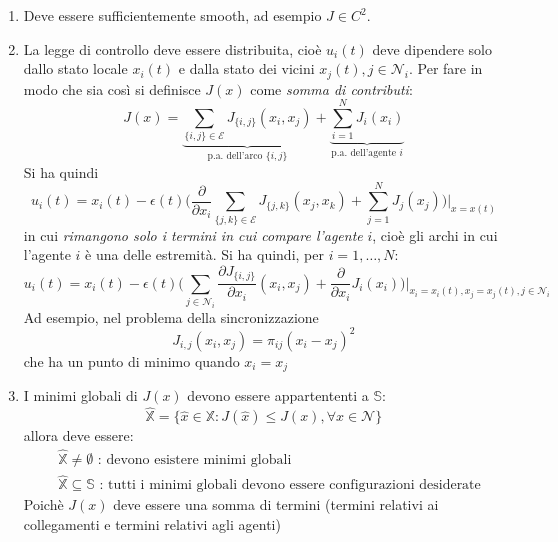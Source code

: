 \begin{enumerate}
\item Deve essere sufficientemente smooth, ad esempio $J \in C^2$.
\item La legge di controllo deve essere distribuita, cio\`e $u_i(t)$ deve dipendere solo dallo stato locale $x_i(t)$ e dalla stato dei vicini $x_j(t), j \in \mathcal{N}_i$. Per fare in modo che sia cos\`i si definisce $J(x)$ come \textit{somma di contributi}:
  \begin{equation}
  J(x) = \underbrace{\sum_{\{i,j\} \in \mathcal{E}} J_{\{i, j\}}(x_i, x_j)}_{\text{p.a. dell'arco $\{i,j\}$}} + \underbrace{\sum_{i=1}^N J_i(x_i)}_{\text{p.a. dell'agente $i$}}
  \end{equation}
  Si ha quindi
  \begin{equation}
  u_i(t) = x_i(t) - \epsilon(t) \Bigg ( \frac{\partial}{\partial x_i} \sum_{\{j,k\} \in \mathcal{E}} J_{\{j,k\}}(x_j, x_k) + \sum_{j=1}^N J_j(x_j) \Bigg) \Bigg |_{x=x(t)}
  \end{equation} in cui \textit{rimangono solo i termini in cui compare l'agente} $i$, cio\`e gli archi in cui l'agente $i$ \`e una delle estremit\`a. Si ha quindi, per $i=1, \dots, N$:
  \begin{equation}
  u_i(t) = x_i(t) - \epsilon(t) \Bigg ( \sum_{j \in \mathcal{N}_i} \frac{\partial J_{\{i,j\}}}{\partial x_i} (x_i, x_j) + \frac{\partial}{\partial x_i} J_i(x_i) \Bigg ) \Bigg |_{x_i = x_i(t), x_j = x_j(t), j \in \mathcal{N}_i}
  \end{equation} Ad esempio, nel problema della sincronizzazione
  \begin{equation}
  J_{i,j}(x_i, x_j) = \pi_{ij} (x_i - x_j)^2
  \end{equation} che ha un punto di minimo quando $x_i = x_j$
\item I minimi globali di $J(x)$ devono essere appartententi a $\mathbb{S}$:
   \begin{equation}
  \hat{\mathbb{X}} = \{ \hat{x} \in \mathbb{X} : J(\hat{x}) \leq J(x), \forall x \in \mathcal{N} \}
   \end{equation} allora deve essere:
   \begin{align*}
    &\hat{\mathbb{X}} \neq \emptyset \text{ : devono esistere minimi globali} \\
    &\hat{\mathbb{X}} \subseteq \mathbb{S} \text{ : tutti i minimi globali devono essere configurazioni desiderate}
   \end{align*} Poich\`e $J(x)$ deve essere una somma di termini (termini relativi ai collegamenti e termini relativi agli agenti)

\end{enumerate}
